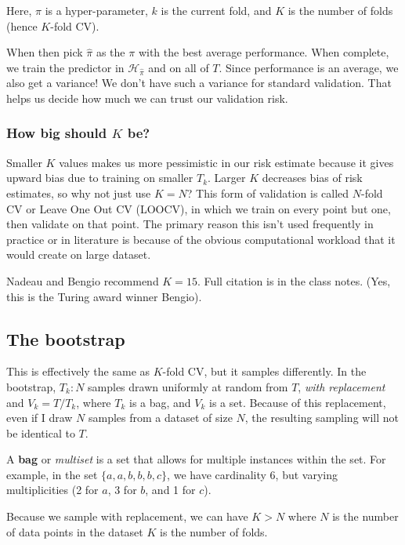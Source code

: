 \documentclass[titlepage, 12pt, leqno]{article}
\begin{document}
\begin{note}
    Here, $\pi$ is a hyper-parameter, $k$ is the current fold, and $K$ is the
    number of folds (hence $K$-fold CV).
\end{note}

When then pick $\hat \pi$ as the $\pi$ with the best average performance. When
complete, we train the predictor in $\mathcal{H}_{\hat \pi}$ and on all of 
$T$. Since performance is an average, we also get a variance! We don't have 
such a variance for standard validation. That helps us decide how much we can
trust our validation risk.

\subsubsection{How big should $K$ be?}
Smaller $K$ values makes us more pessimistic in our risk estimate because it
gives upward bias due to training on smaller $T_{k}$. Larger $K$ decreases
bias of risk estimates, so why not just use $K=N$? This form of validation is
called $N$-fold CV or Leave One Out CV (LOOCV), in which we train on every 
point but one, then validate on that point. The primary reason this isn't used
frequently in practice or in literature is because of the obvious computational
workload that it would create on large dataset.
\begin{note}
    Nadeau and Bengio recommend $K=15$. Full citation is in the class notes.
    (Yes, this is the Turing award winner Bengio).
\end{note}

\subsection{The bootstrap}
This is effectively the same as $K$-fold CV, but it samples differently. In
the bootstrap, $T_{k}:N$ samples drawn uniformly at random from $T$, 
\textit{with replacement} and $V_{k}=T/T_{k}$, where $T_{k}$ is a bag, and
$V_{k}$ is a set. Because of this replacement, even if I draw $N$ samples from
a dataset of size $N$, the resulting sampling will not be identical to $T$.
\begin{definition}
    A \textbf{bag} or \textit{multiset} is a set that allows for multiple
    instances within the set. For example, in the set $\{a,a,b,b,b,c\}$, we
    have cardinality 6, but varying multiplicities (2 for $a$, 3 for $b$, and 1
    for $c$).
\end{definition}

\begin{note}
    Because we sample with replacement, we can have $K>N$ where $N$ is the
    number of data points in the dataset $K$ is the number of folds.
\end{note}
\end{document}
